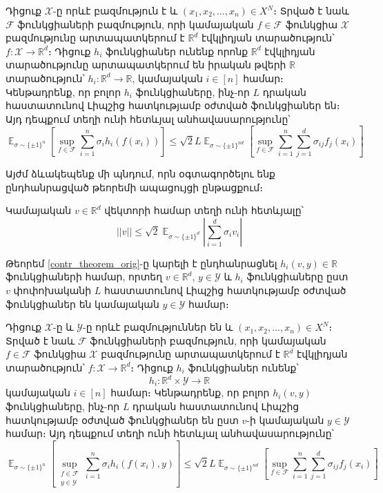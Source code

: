 \documentclass[12pt]{article}
\DeclareMathOperator*{\E}{\mathbb{E}}
\begin{document}
\begin{theorem}
\label{contr_theorem_orig}
Դիցուք $\mathcal{X}$-ը որևէ բազմություն է և $(x_1, x_2, ..., x_n) \in X^N$։ Տրված է նաև $\mathcal{F}$ ֆունկցիաների բազմություն, որի կամայական $f \in \mathcal{F}$ ֆունկցիա $\mathcal{X}$ բազմությունը արտապատկերում է $\mathbb{R}^d$ էվկլիդյան տարածություն՝ $f:\mathcal{X} \rightarrow \mathbb{R}^d$։ Դիցուք $h_i$ ֆունկցիաներ ունենք որոնք $\mathbb{R}^d$ էվկլիդյան տարածությունը արտապատկերում են  իրական թվերի $\mathbb{R}$ տարածություն՝
$h_i:\mathbb{R}^d \rightarrow \mathbb{R}$, կամայական $i \in [n]$ համար։ Կենթադրենք, որ բոլոր $h_i$ ֆունկցիաները, ինչ-որ $L$ դրական հաստատունով Լիպշից հատկությամբ օժտված ֆունկցիաներ են։ Այդ դեպքում տեղի ունի հետևյալ անհավասարությունը՝
\begin{equation}
\label{contradiction_ineq_1}
\E_{\sigma \sim \{\pm 1\}^n}\left[\sup_{f \in \mathcal{F}}  \sum_{i=1}^n{\sigma_ih_i(f(x_i))}  \right]    \leq \sqrt{2}L \E_{\sigma \sim \{\pm1\}^{nd}} \left[  \sup_{f \in \mathcal{F}}  \sum_{i=1}^n\sum_{j=1}^d{\sigma_{ij}f_j(x_i)}   \right]
\end{equation}
\end{theorem}





Այժմ  ձևակեպենք մի պնդում, որն օգտագործելու ենք ընդհանրացված թեորեմի ապացույցի ընթացքում։  
\begin{preposition}
\label{prep_vec_ineq}
Կամայական $v \in \mathbb{R}^d$ վեկտորի համար տեղի ունի հետևյալը՝
$$||v|| \leq \sqrt{2}\E_{\sigma \sim \{\pm1\}^d} \left| \sum_{i=1}^d \sigma_iv_i \right|$$
\end{preposition}


Թեորեմ \ref{contr_theorem_orig}-ը կարելի է ընդհանրացնել  $h_i(v, y) \in \mathbb{R}$ ֆունկցիաների համար, որտեղ $v \in \mathbb{R}^d$, $y \in \mathcal{Y}$ և $h_i$ ֆունկցիաները ըստ $v$ փոփոխականի $L$ հաստատունով Լիպշից հատկությամբ օժտված ֆունկցիաներ են կամայական $y \in \mathcal{Y}$ համար։ 

\begin{theorem}
\label{contr_theorem}
Դիցուք $\mathcal{X}$-ը և $\mathcal{Y}$-ը որևէ բազմություններ են  և $(x_1, x_2, ..., x_n) \in X^N$։ Տրված է նաև $\mathcal{F}$ ֆունկցիաների բազմություն, որի կամայական $f \in \mathcal{F}$ ֆունկցիա $\mathcal{X}$ բազմությունը արտապատկերում է $\mathbb{R}^d$ էվկլիդյան տարածություն՝ $f:\mathcal{X} \rightarrow \mathbb{R}^d$։ Դիցուք $h_i$ ֆունկցիաներ ունենք՝ $$h_i:\mathbb{R}^d \times \mathcal{Y} \rightarrow \mathbb{R}$$ կամայական $i \in [n]$ համար։ Կենթադրենք, որ բոլոր $h_i(v, y)$ ֆունկցիաները, ինչ-որ $L$ դրական հաստատունով Լիպշից հատկությամբ օժտված ֆունկցիաներ են ըստ $v$-ի կամայական $y \in \mathcal{Y}$ համար։ Այդ դեպքում տեղի ունի հետևյալ անհավասարությունը՝
\begin{equation}
\label{contradiction_ineq}
\E_{\sigma \sim \{\pm 1\}^n}\left[\sup_{\substack{f \in \mathcal{F} \\ y \in \mathcal{Y}} }  \sum_{i=1}^n{\sigma_ih_i(f(x_i), y)}  \right]    \leq \sqrt{2}L \E_{\sigma \sim \{\pm1\}^{nd}} \left[  \sup_{f \in \mathcal{F}}  \sum_{i=1}^n\sum_{j=1}^d{\sigma_{ij}f_j(x_i)}   \right]
\end{equation}
\end{theorem}
\end{document}
